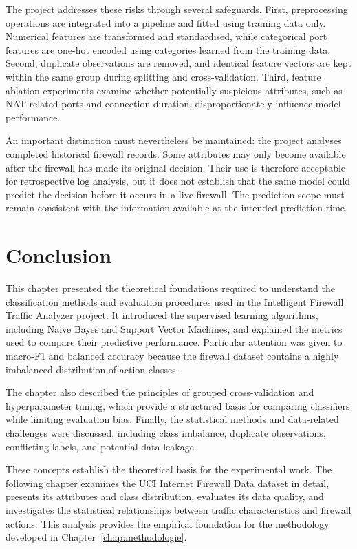 The project addresses these risks through several safeguards. First, preprocessing operations are integrated into a pipeline and fitted using training data only. Numerical features are transformed and standardised, while categorical port features are one-hot encoded using categories learned from the training data. Second, duplicate observations are removed, and identical feature vectors are kept within the same group during splitting and cross-validation. Third, feature ablation experiments examine whether potentially suspicious attributes, such as NAT-related ports and connection duration, disproportionately influence model performance.

An important distinction must nevertheless be maintained: the project analyses completed historical firewall records. Some attributes may only become available after the firewall has made its original decision. Their use is therefore acceptable for retrospective log analysis, but it does not establish that the same model could predict the decision before it occurs in a live firewall. The prediction scope must remain consistent with the information available at the intended prediction time.

\section{Conclusion}

This chapter presented the theoretical foundations required to understand the classification methods and evaluation procedures used in the Intelligent Firewall Traffic Analyzer project. It introduced the supervised learning algorithms, including Naive Bayes and Support Vector Machines, and explained the metrics used to compare their predictive performance. Particular attention was given to macro-F1 and balanced accuracy because the firewall dataset contains a highly imbalanced distribution of action classes.

The chapter also described the principles of grouped cross-validation and hyperparameter tuning, which provide a structured basis for comparing classifiers while limiting evaluation bias. Finally, the statistical methods and data-related challenges were discussed, including class imbalance, duplicate observations, conflicting labels, and potential data leakage.

These concepts establish the theoretical basis for the experimental work. The following chapter examines the UCI Internet Firewall Data dataset in detail, presents its attributes and class distribution, evaluates its data quality, and investigates the statistical relationships between traffic characteristics and firewall actions. This analysis provides the empirical foundation for the methodology developed in Chapter~\ref{chap:methodologie}.
